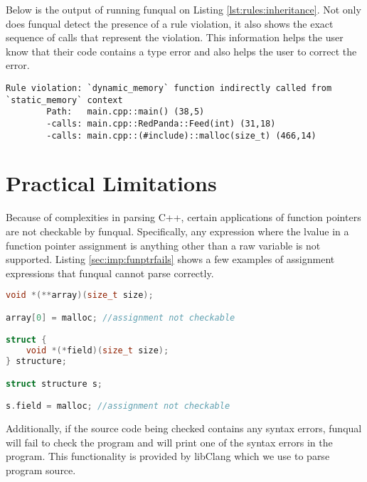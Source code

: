 Below is the output of running funqual on Listing \ref{lst:rules:inheritance}.  Not only does funqual detect the presence of a rule violation, it also shows the exact sequence of calls that represent the violation.  This information helps the user know that their code contains a type error and also helps the user to correct the error.

\noindent\begin{minipage}[t]{\linewidth}
\begin{lstlisting}
Rule violation: `dynamic_memory` function indirectly called from `static_memory` context
        Path:   main.cpp::main() (38,5)
        -calls: main.cpp::RedPanda::Feed(int) (31,18)
        -calls: main.cpp::(#include)::malloc(size_t) (466,14)
\end{lstlisting}
\end{minipage}

\section{Practical Limitations}

Because of complexities in parsing C++, certain applications of function pointers are not checkable by funqual.  Specifically, any expression where the lvalue in a function pointer assignment is anything other than a raw variable is not supported.  Listing \ref{sec:imp:funptrfails} shows a few examples of assignment expressions that funqual cannot parse correctly.

\noindent\begin{minipage}[t]{\linewidth}
\begin{lstlisting}[language=c++,label={sec:imp:funptrfails},caption={Examples of function pointer assignment expressions that are not parsed correctly by funqual}]
void *(**array)(size_t size);

array[0] = malloc; //assignment not checkable

struct {
    void *(*field)(size_t size);
} structure;

struct structure s;

s.field = malloc; //assignment not checkable
\end{lstlisting}
\end{minipage}

Additionally, if the source code being checked contains any syntax errors, funqual will fail to check the program and will print one of the syntax errors in the program.  This functionality is provided by libClang which we use to parse program source.  
